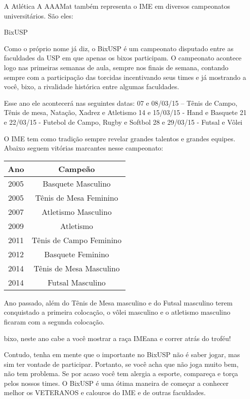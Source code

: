 \begin{secao}{A Atlética}
A AAAMat também representa o IME em diversos campeonatos universitários. São
eles:

\begin{subsecao}{BixUSP}

Como o próprio nome já diz, o BixUSP é um campeonato disputado entre as faculdades da USP em que apenas os bixos participam. O campeonato acontece logo nas primeiras semanas de aula, sempre nos finais de semana,
contando sempre com a participação das torcidas incentivando seus times
e já mostrando a você, bixo, a rivalidade histórica entre algumas faculdades.

Esse ano ele acontecerá nas seguintes datas:
07 e 08/03/15 – Tênis de Campo, Tênis de mesa, Natação, Xadrez e Atletismo
14 e 15/03/15 - Hand e Basquete
21 e 22/03/15 - Futebol de Campo, Rugby e Softbol
28 e 29/03/15 - Futsal e Vôlei

O IME tem como tradição sempre revelar grandes talentos e grandes equipes.
Abaixo seguem vitórias marcantes nesse campeonato:

\begin{center}
	\begin{tabular}{c|c}
	  \hline
	  Ano & Campeão\\
	  \hline
	  2005 & Basquete Masculino \\
	  2005 & Tênis de Mesa Feminino \\
	  2007 & Atletismo Masculino\\
	  2009 & Atletismo\\
	  2011 & Tênis de Campo Feminino\\
	  2012 & Basquete Feminino\\
	  2014 & Tênis de Mesa Masculino\\
	  2014 & Futsal Masculino\\
 	  \hline
	\end{tabular}
\end{center}

Ano passado, além do Tênis de Mesa masculino e do Futsal masculino terem conquistado a primeira colocação, o vôlei masculino e o atletismo masculino ficaram com a segunda colocação. %

bixo, neste ano cabe a você mostrar a raça IMEana e correr atrás do troféu!

Contudo, tenha em mente que o importante no BixUSP não é saber jogar,
mas sim ter vontade de participar.
Portanto, se você acha que não joga muito bem, não tem problema. Se por acaso
você tem alergia a esporte, compareça e torça pelos nossos times. O BixUSP é uma
ótima maneira de começar a conhecer melhor os VETERANOS e calouros do
IME e de outras faculdades.


\end{subsecao}
\end{secao}
